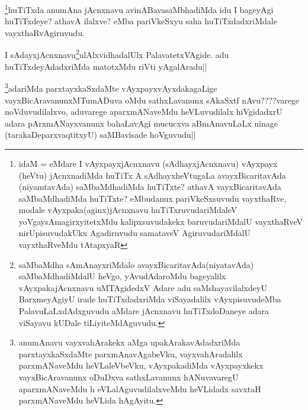 \begin{artha}
\footnote{idaM = eMdare I vAyxpayxjAcnxnavu (sAdhayxjAcnxnavu) vAyxpayx (heVtu) jAcnxnadiMda huTiTx A sAdhayxheVtugaLa avayxBicaritavAda (niyamtavAda) saMbaMdhadiMda huTiTxte? athavA vayxBicaritavAda saMbaMdhadiMda huTiTxte? eMbudanux pariVkeSxsuvudu vayxthaRve, modale vAyxpaka(aginx)jAcnxnavu huTiTxruvudariMdaleV yoVgaysAmagirxyitetxMdu kalipxsuvudakekx baruvudariMdalU vayxthaRveV nirUpisuvudakUkx Agadiruvudu samataveV AgiruvudariMdalU vayxthaRveMdu tAtapxyaR}huTiTxda anumAna jAcnxnavu avinABavasaMbhadiMda idu I bageyAgi huTiTxdeye? athavA ilalxve? eMba pariVkeSxyu saha huTiTxdadxriMdale vayxthaRvAgiruvudu.
\end{artha}

\begin{artha}
I sAdayxjAcnxnavu\footnote{saMbaMdha sAmAnayxriMdalo avayxBicaritavAda(niyatavAda) saMbaMdhadiMdalU heVgo, yAvudAdaroMdu bageyalilx vAyxpakajAcnxnavu uMTAgidedxV Adare adu saMshayavilalxdeyU BarxmeyAgiyU irade huTiTxdadxriMda viSayadalilx vAyxpisuvudeMba  PalavuLaLxdAdxguvudu aMdare jAcnxnavu huTiTxdoDaneye adara viSayavu kUDale tiLiyiteMdAguvudu.}ulAlxvidhadalUlx PalavatetxVAgide. adu huTiTxdeyAdadxriMda matotxMdu riVti yAgalAradu||
\end{artha}

\begin{artha}
\footnote{anumAnavu vayxvahArakekx aMga upakArakavAdadxriMda parxtayxkaSxdaMte parxmAnavAgabeVku, vayxvahAradalilx parxmANaveMdu heVLaleVbeVku, vAyxpakadiMda vAyxpayxkekx vayxBicAravanunx oDuDxva sathxLavanunx hANuvavaregU aparxmANaveMdu h eVLalAguvudilalxveMdu heVLidadx savxtaH parxmANaveMdu heVLida hAgAyitu.}adariMda parxtayxkaSxdaMte vAyxpayxvAyxdakagaLige vayxBicAravanunxMTumADuva oMdu sathxLavanunx sAkaSxtf nAvu????varege noVduvudilalxvo, aduvarege aparxmANaveMdu heVLuvudilalx hiVgidadxrU adara pArxmANayxvanunx bahaLavAgi mucucxva aBmAnavuLaLx ninage (tarakaDeparxvaqtitxyU) saMBavisade hoVguvudu||
\end{artha}

